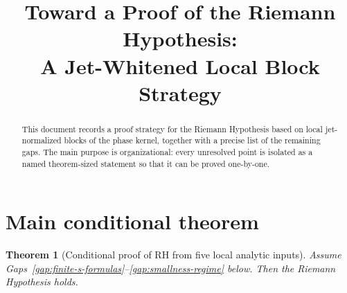 \documentclass[11pt]{article}
\title{Toward a Proof of the Riemann Hypothesis:\\
A Jet-Whitened Local Block Strategy}
\author{}
\date{}
\newtheorem{theorem}{Theorem}
\newcommand{\RH}{\mathrm{RH}}
\begin{document}
\maketitle

\begin{abstract}
This document records a proof strategy for the Riemann Hypothesis based on
local jet-normalized blocks of the phase kernel, together with a precise list
of the remaining gaps.
The main purpose is organizational: every unresolved point is isolated as a
named theorem-sized statement so that it can be proved one-by-one.
\end{abstract}

\section{Main conditional theorem}

\begin{theorem}[Conditional proof of $\RH$ from five local analytic inputs]
Assume Gaps~\ref{gap:finite-s-formulas}--\ref{gap:smallness-regime} below.
Then the Riemann Hypothesis holds.
\end{theorem}
\end{document}
